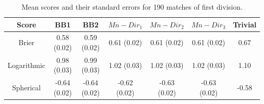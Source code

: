\documentclass[journal,article,accept,moreauthors,pdftex,12pt,a4paper]{mdpi}
\begin{document}
	
	\begin{table}[H]
		\begin{center}
			\begin{tabular}{ccccccc}
				\hline
				Score & BB1 & BB2 & $Mn-Dir_1$ & $Mn-Dir_2$ & $Mn-Dir_3$ & Trivial \\
				\hline
				\hline
				Brier &0.58 (0.02) & 0.59 (0.02)& 0.61 (0.02)& 0.61 (0.02) & 0.61  (0.02) & 0.67 \\
				Logarithmic & 0.98 (0.03) & 0.99 (0.03) & 1.02 (0.03)  & 1.02 (0.03)  & 1.02 (0.03) & 1.10  \\
				Spherical &  -0.64 (0.02)& -0.64 (0.02)& -0.62 (0.02)& -0.63 (0.02)& -0.63 (0.02)& -0.58\\
				\hline
			\end{tabular}
			\caption{Mean scores and their standard errors for 190 matches of first division.}
			\label{tab::brier}
		\end{center}
	\end{table}
	
	
		
\end{document}
